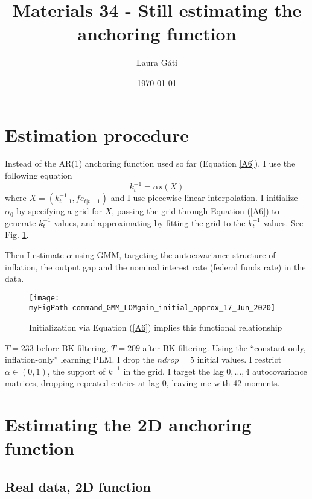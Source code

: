 \documentclass[11pt]{article}
\def \myFigPath {../../figures/}
\renewcommand{\[}{\begin{equation}}
\renewcommand{\]}{\end{equation}}
\begin{document}
\linespread{1.0}

\title{Materials 34 - Still estimating the anchoring function}
\author{Laura G\'ati} 
\date{\today}
\maketitle




\section{Estimation procedure}
Instead of the AR(1) anchoring function used so far (Equation \ref{A6}), I use the following equation
\begin{equation}
k_t^{-1} = \alpha s(X)
\end{equation}
where $X = (k^{-1}_{t-1}, fe_{t|t-1})$ and I use piecewise linear interpolation. I initialize $\alpha_0$ by specifying a grid for $X$, passing the grid through Equation (\ref{A6}) to generate $k^{-1}_t$-values, and approximating by fitting the grid to the $k^{-1}_t$-values.  See Fig. \ref{fig_initial_anchor_fct}.

Then I estimate $\alpha$ using GMM, targeting the autocovariance structure of inflation, the output gap and the nominal interest rate (federal funds rate) in the data. 

\begin{figure}[h!]
\texttt{[image: \\myFigPath command\_GMM\_LOMgain\_initial\_approx\_17\_Jun\_2020]}
\caption{Initialization via Equation (\ref{A6}) implies this functional relationship}
\label{fig_initial_anchor_fct}
\end{figure}

$T=233$ before BK-filtering, $T=209$ after BK-filtering. Using the ``constant-only, inflation-only'' learning PLM. I drop the $ndrop=5$ initial values. I restrict $\alpha \in (0,1)$, the support of $k^{-1}$ in the grid. I target the lag $0,\dots,4$ autocovariance matrices, dropping repeated entries at lag 0, leaving me with 42 moments.

\clearpage
\section{Estimating the 2D anchoring function}
\subsection{Real data, 2D function}
\end{document}
